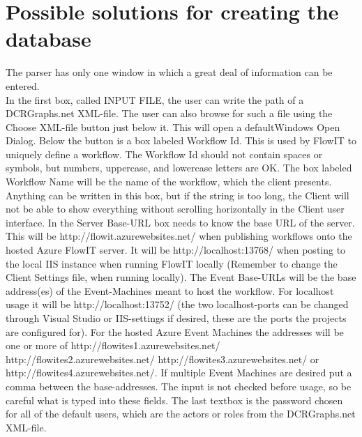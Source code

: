 \section{Possible solutions for creating the database \label{sec:SolutionsForCreatingTheDatabaseAppendix}}
The parser has only one window in which a great deal of information can be entered. \\
In the first box, called INPUT FILE, the user can write the path of a DCRGraphs.net XML-file. The user can also browse for such a file using the Choose XML-file button just below it. This will open a defaultWindows Open Dialog. Below the button is a box labeled Workflow Id. This is used by FlowIT to uniquely define a workflow.  \newline
The Workflow Id should not contain spaces or symbols, but numbers, uppercase, and lowercase letters are OK. \newline
The box labeled Workflow Name will be the name of the workflow, which the client presents. Anything can be written in this box, but if the string is too long, the Client will not be able to show everything without scrolling horizontally in the Client user interface. \newline
In the Server Base-URL box needs to know the base URL of the server. \newline
This will be http://flowit.azurewebsites.net/ when publishing workflows onto the hosted Azure FlowIT server. It will be http://localhost:13768/ when posting to the local IIS instance when running FlowIT locally (Remember to change the Client Settings file, when running locally). \newline
The Event Base-URLs will be the base address(es) of the Event-Machines meant to host the workflow. For localhost usage it will be http://localhost:13752/ (the two localhost-ports can be changed through Visual Studio or IIS-settings if desired, these are the ports the projects are configured for).  \newline
For the hosted Azure Event Machines the addresses will be one or more of http://flowites1.azurewebsites.net/ http://flowites2.azurewebsites.net/ http://flowites3.azurewebsites.net/ or http://flowites4.azurewebsites.net/. If multiple Event Machines are desired put a comma between the base-addresses. The input is not checked before usage, so be careful what is typed into these fields. \newline
The last textbox is the password chosen for all of the default users, which are the actors or roles from the DCRGraphs.net XML-file. \newline
